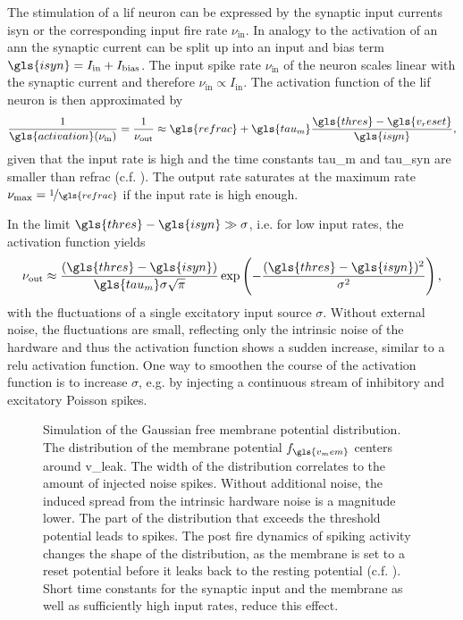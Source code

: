 The stimulation of a \gls{lif} neuron can be expressed by the synaptic input currents \gls{isyn} or the corresponding input fire rate $\nu_\text{in}$. In analogy to the activation of an \gls{ann} the synaptic current can be split up into an input and bias term $\gls{isyn} = I_\text{in} + I_\text{bias}$. The input spike rate $\nu_\text{in}$ of the neuron scales linear with the synaptic current and therefore $\nu_\text{in} \propto I_\text{in}$. The activation function of the \gls{lif} neuron is then approximated by 
\begin{equation}
\frac{1}{\gls{activation}(\nu_\text{in})} = \frac{1}{\nu_\text{out}} \approx \gls{refrac} + \gls{tau_m} \frac{\gls{thres} - \gls{v_reset}}{\gls{isyn}},
\label{fireratehigh}
\end{equation}
given that the input rate is high and the time constants \gls{tau_m} and \gls{tau_syn} are smaller than \gls{refrac} (c.f. \citealp{brunel2000dynamics}).
The output rate saturates at the maximum rate $\nu_\text{max} = \nicefrac{1}{\gls{refrac}}$ if the input rate is high enough.

In the limit $\gls{thres} - \gls{isyn} \gg \sigma$, i.e. for low input rates, the activation function yields
\begin{equation}
\nu_\text{out} \approx \frac{(\gls{thres} - \gls{isyn})}{\gls{tau_m}\sigma \sqrt{\pi}} \exp\left(-\frac{(\gls{thres} - \gls{isyn})^2}{\sigma^2}\right),
\label{fireratelow}
\end{equation}
with the fluctuations of a single excitatory input source $\sigma$. 
Without external noise, the fluctuations are small, reflecting only the intrinsic noise of the hardware and thus the activation function shows a sudden increase, similar to a \gls{relu} activation function. One way to smoothen the course of the activation function is to increase $\sigma$, e.g. by injecting a continuous stream of inhibitory and excitatory Poisson spikes.

\begin{figure}
	\begin{center}
		
	\end{center}
	\caption[Simulation of the Gaussian free membrane potential distribution.]{Simulation of the Gaussian free membrane potential distribution. The distribution of the membrane potential $f_{\gls{v_mem}}$ centers around \gls{v_leak}. The width of the distribution correlates to the amount of injected noise spikes. Without additional noise, the induced spread from the intrinsic hardware noise is a magnitude lower. The part of the distribution that exceeds the threshold potential leads to spikes. The post fire dynamics of spiking activity changes the shape of the distribution, as the membrane is set to a reset potential before it leaks back to the resting potential (c.f. \citealp{petrovici12phdthesis}). Short time constants for the synaptic input and the membrane as well as sufficiently high input rates, reduce this effect.}
	\label{theoretical_vleak_w_noise}
\end{figure}

